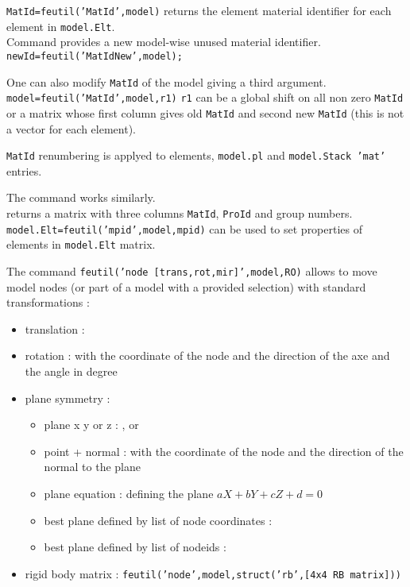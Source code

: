 
{\tt MatId=feutil('MatId',model)} returns the element material identifier for each element in {\tt model.Elt}.\\
Command  provides a new model-wise unused material identifier. {\tt newId=feutil('MatIdNew',model);} \\
\begin{SDT}
One can also modify {\tt MatId} of the model giving a third argument.
{\tt model=feutil('MatId',model,r1)} {\tt r1} can be a global shift on all non zero {\tt MatId} or a matrix whose first column gives old {\tt MatId} and second new {\tt MatId} (this is not a vector for each element).

{\tt MatId} renumbering is applyed to elements, {\tt model.pl} and {\tt model.Stack 'mat'} entries. 
\end{SDT}
The  command works similarly.\\

 returns a matrix with three columns {\tt MatId}, {\tt ProId} and group numbers.\\
{\tt model.Elt=feutil('mpid',model,mpid)} can be used to set properties of elements in {\tt model.Elt} matrix.


The command {\tt feutil('node [trans,rot,mir]',model,RO)} allows to move model nodes (or part of a model with a provided selection) with standard transformations :

\begin{itemize}
\item translation :  
\item rotation :   with  the coordinate of the node and  the direction of the axe and  the angle in degree 
\item plane symmetry : 
\begin{itemize}
\item plane x y or z :  ,   or  
\item point + normal :   with  the coordinate of the node and  the direction of the normal to the plane
\item plane equation :   defining the plane $aX+bY+cZ+d=0$
\item best plane defined by list of node coordinates : 
\item best plane defined by list of nodeids :  
\end{itemize}
\item rigid body matrix : {\tt feutil('node',model,struct('rb',[4x4 RB matrix]))}
\end{itemize}

